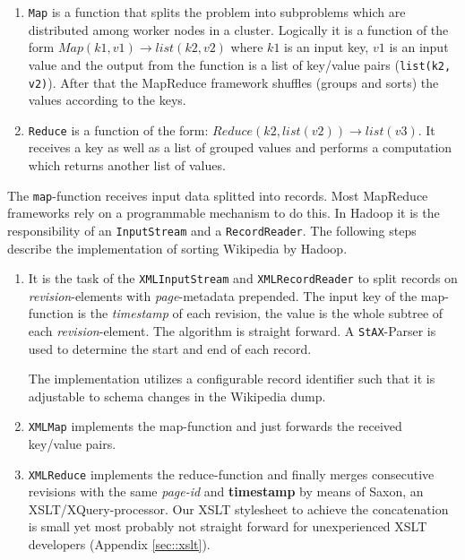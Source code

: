 \begin{enumerate}
\item \texttt{Map} is a function that splits the problem into subproblems which are distributed among worker nodes in a cluster. Logically it is a function of the form \texttt{$Map(k1,v1) \rightarrow list(k2,v2)$} where $k1$ is an input key, $v1$ is an input value and the output from the function is a list of key/value pairs (\texttt{list(k2, v2)}). After that the MapReduce framework shuffles (groups and sorts) the values according to the keys.
\item \texttt{Reduce} is a function of the form: \texttt{$Reduce(k2, list (v2)) \rightarrow list(v3)$}. It receives a key as well as a list of grouped values and performs a computation which returns another list of values.
\end{enumerate}

The \texttt{map}-function receives input data splitted into records. Most MapReduce frameworks rely on a programmable mechanism to do this. In Hadoop it is the responsibility of an \texttt{InputStream} and a \texttt{RecordReader}. The following steps describe the implementation of sorting Wikipedia by Hadoop.

\begin{enumerate}
\item It is the task of the \texttt{XMLInputStream} and \texttt{XMLRecordReader} to split records on \emph{revision}-elements with \emph{page}-metadata prepended. The input key of the map-function is the \emph{timestamp} of each revision, the value is the whole subtree of each \emph{revision}-element. The algorithm is straight forward. A \texttt{StAX}-Parser is used to determine the start and end of each record.

The implementation utilizes a configurable record identifier such that it is adjustable to schema changes in the Wikipedia dump. 

\item \texttt{XMLMap} implements the map-function and just forwards the received key/value pairs.
\item \texttt{XMLReduce} implements the reduce-function and finally merges consecutive revisions with the same \emph{page-id} and \textbf{timestamp} by means of Saxon, an XSLT/XQuery-processor. Our XSLT stylesheet to achieve the concatenation is small yet most probably not straight forward for unexperienced XSLT developers (Appendix \ref{sec::xslt}).
\end{enumerate}

